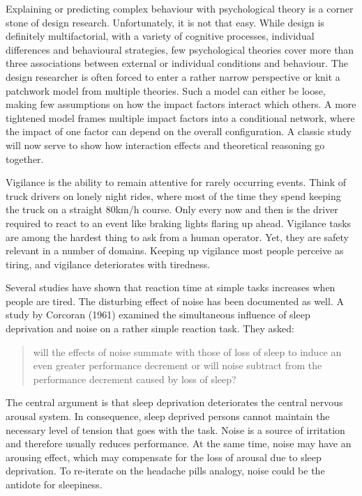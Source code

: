\documentclass[]{svmono}
\begin{document}
Explaining or predicting complex behaviour with psychological theory is
a corner stone of design research. Unfortunately, it is not that easy.
While design is definitely multifactorial, with a variety of cognitive
processes, individual differences and behavioural strategies, few
psychological theories cover more than three associations between
external or individual conditions and behaviour. The design researcher
is often forced to enter a rather narrow perspective or knit a patchwork
model from multiple theories. Such a model can either be loose, making
few assumptions on how the impact factors interact which others. A more
tightened model frames multiple impact factors into a conditional
network, where the impact of one factor can depend on the overall
configuration. A classic study will now serve to show how interaction
effects and theoretical reasoning go together.

Vigilance is the ability to remain attentive for rarely occurring
events. Think of truck drivers on lonely night rides, where most of the
time they spend keeping the truck on a straight 80km/h course. Only
every now and then is the driver required to react to an event like
braking lights flaring up ahead. Vigilance tasks are among the hardest
thing to ask from a human operator. Yet, they are safety relevant in a
number of domains. Keeping up vigilance most people perceive as tiring,
and vigilance deteriorates with tiredness.

Several studies have shown that reaction time at simple tasks increases
when people are tired. The disturbing effect of noise has been
documented as well. A study by Corcoran (1961) examined the simultaneous
influence of sleep deprivation and noise on a rather simple reaction
task. They asked:

\begin{quote}
will the effects of noise summate with those of loss of sleep to induce
an even greater performance decrement or will noise subtract from the
performance decrement caused by loss of sleep?
\end{quote}

The central argument is that sleep deprivation deteriorates the central
nervous arousal system. In consequence, sleep deprived persons cannot
maintain the necessary level of tension that goes with the task. Noise
is a source of irritation and therefore usually reduces performance. At
the same time, noise may have an arousing effect, which may compensate
for the loss of arousal due to sleep deprivation. To re-iterate on the
headache pills analogy, noise could be the antidote for sleepiness.
\end{document}
